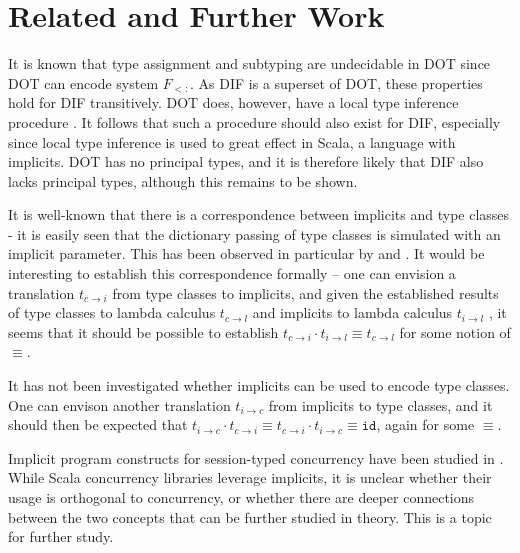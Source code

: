 \section{Related and Further Work}

It is known that type assignment and subtyping are undecidable in DOT
\cite{AR16} since DOT can encode system $F_{<:}$. As DIF is a superset of DOT,
these properties hold for DIF transitively. DOT does, however, have a local type
inference procedure \cite{PT00}. It follows that such a procedure should also
exist for DIF, especially since local type inference is used to great effect in
Scala, a language with implicits. DOT has no principal types, and it is
therefore likely that DIF also lacks principal types, although this remains to
be shown.

It is well-known that there is a correspondence between implicits and type
classes - it is easily seen that the dictionary passing of type classes is
simulated with an implicit parameter. This has been observed in particular by
\cite{OMO10} and \cite{OSCLYW12}. It would be interesting to establish this
correspondence formally -- one can envision a translation $t_{c \rightarrow i}$
from type classes to implicits, and given the established results of type
classes to lambda calculus $t_{c \rightarrow l}$ \cite{WB89} and implicits to
lambda calculus $t_{i \rightarrow l}$ \cite{OBLB18}, it seems that it should be
possible to establish $t_{c \rightarrow i} \cdot t_{i \rightarrow l} \equiv t_{c
\rightarrow l}$ for some notion of $\equiv$.

It has not been investigated whether implicits can be used to encode type
classes. One can envison another translation $t_{i \rightarrow c}$ from
implicits to type classes, and it should then be expected that $t_{i
\rightarrow c} \cdot t_{c \rightarrow i} \equiv t_{c \rightarrow i} \cdot t_{i
\rightarrow c} \equiv \mathtt{id}$, again for some $\equiv$.

Implicit program constructs for session-typed concurrency have been studied in
\cite{JB18}. While Scala concurrency libraries leverage implicits, it is unclear
whether their usage is orthogonal to concurrency, or whether there are deeper
connections between the two concepts that can be further studied in theory. This
is a topic for further study.
